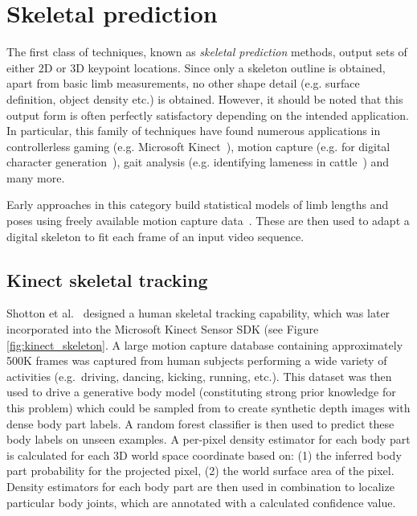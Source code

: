 \section{Skeletal prediction}

The first class of techniques, known as \textit{skeletal prediction} methods, output sets of either 2D or 3D keypoint locations. Since only a skeleton outline is obtained, apart from basic limb measurements, no other shape detail (e.g. surface definition, object density etc.) is obtained. However, it should be noted that this output form is often perfectly satisfactory depending on the intended application. In particular, this family of techniques have found numerous applications in controllerless gaming (e.g. Microsoft Kinect~\cite{kinectpaper}), motion capture (e.g. for digital character generation~\cite{xxx}), gait analysis (e.g. identifying lameness in cattle~\cite{xxx}) and many more. 

Early approaches in this category build statistical models of limb lengths and poses using freely available motion capture data~\cite{barron2001estimating}. These are then used to adapt a digital skeleton to fit each frame of an input video sequence.  

    \subsection{Kinect skeletal tracking}
    Shotton et al.~\cite{kinectpaper} designed a human skeletal tracking capability, which was later incorporated into the Microsoft Kinect Sensor SDK (see Figure \ref{fig:kinect_skeleton}. A large motion capture database containing approximately 500K frames was captured from human subjects performing a wide variety of activities (e.g.\ driving, dancing, kicking, running, etc.). This dataset was then used to drive a generative body model (constituting strong prior knowledge for this problem) which could be sampled from to create synthetic depth images with dense body part labels. A random forest classifier is then used to predict these body labels on unseen examples. A per-pixel density estimator for each body part is calculated for each 3D world space coordinate based on: (1) the inferred body part probability for the projected pixel, (2) the world surface area of the pixel. Density estimators for each body part are then used in combination to localize particular body joints, which are annotated with a calculated confidence value. 

